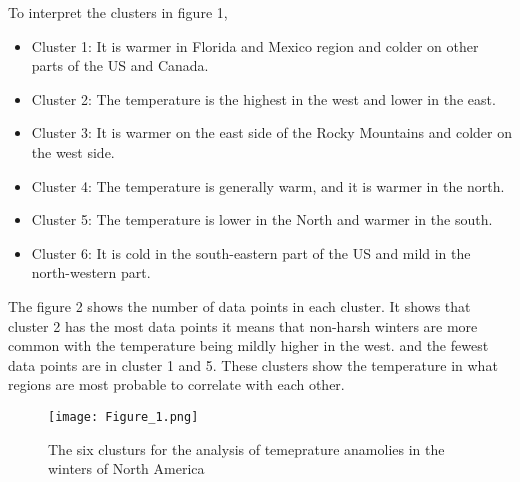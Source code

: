 \documentclass[12pt]{article}
\begin{document}
To interpret the clusters in figure 1,
\begin{itemize}
    \item Cluster 1: It is warmer in Florida and Mexico region and colder on other parts of the US and Canada.
    \item Cluster 2: The temperature is the highest in the west and lower in the east.
    \item Cluster 3: It is warmer on the east side of the Rocky Mountains and colder on the west side.
    \item Cluster 4: The temperature is generally warm, and it is warmer in the north.
    \item Cluster 5: The temperature is lower in the North and warmer in the south.
    \item Cluster 6: It is cold in the south-eastern part of the US and mild in the north-western part.
\end{itemize}

The figure 2 shows the number of data points in each cluster.
It shows that cluster 2 has the most data points it means that non-harsh winters are more common with the temperature being mildly higher in the west.
and the fewest data points are in cluster 1 and 5.
These clusters show the temperature in what regions are most probable to correlate with each other.\\

\begin{figure}
\begin{center}
\texttt{[image: Figure\_1.png]}
\caption{The six clusturs for the analysis of temeprature anamolies in the winters of North America}{\label{fig: problem-2-c}}
\end{center}
\end{figure}
\end{document}
